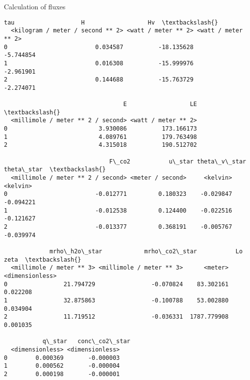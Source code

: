 \begin{block}{Calculation of fluxes}
    \begin{Verbatim}[commandchars=\\\{\}]
                               tau                   H                  Hv  \textbackslash{}
  <kilogram / meter / second ** 2> <watt / meter ** 2> <watt / meter ** 2>   
0                         0.034587          -18.135628           -5.744854   
1                         0.016308          -15.999976           -2.961901   
2                         0.144688          -15.763729           -2.274071   

                                  E                  LE  \textbackslash{}
  <millimole / meter ** 2 / second> <watt / meter ** 2>   
0                          3.930086          173.166173   
1                          4.089761          179.763498   
2                          4.315018          190.512702   

                              F\_co2           u\_star theta\_v\_star theta\_star  \textbackslash{}
  <millimole / meter ** 2 / second> <meter / second>     <kelvin>   <kelvin>   
0                         -0.012771         0.180323    -0.029847  -0.094221   
1                         -0.012538         0.124400    -0.022516  -0.121627   
2                         -0.013377         0.368191    -0.005767  -0.039974   

             mrho\_h2o\_star            mrho\_co2\_star           Lo            zeta  \textbackslash{}
  <millimole / meter ** 3> <millimole / meter ** 3>      <meter> <dimensionless>   
0                21.794729                -0.070824    83.302161        0.022208   
1                32.875863                -0.100788    53.002880        0.034904   
2                11.719512                -0.036331  1787.779908        0.001035   

           q\_star   conc\_co2\_star  
  <dimensionless> <dimensionless>  
0        0.000369       -0.000003  
1        0.000562       -0.000004  
2        0.000198       -0.000001  

    \end{Verbatim}

    
\end{block} 

